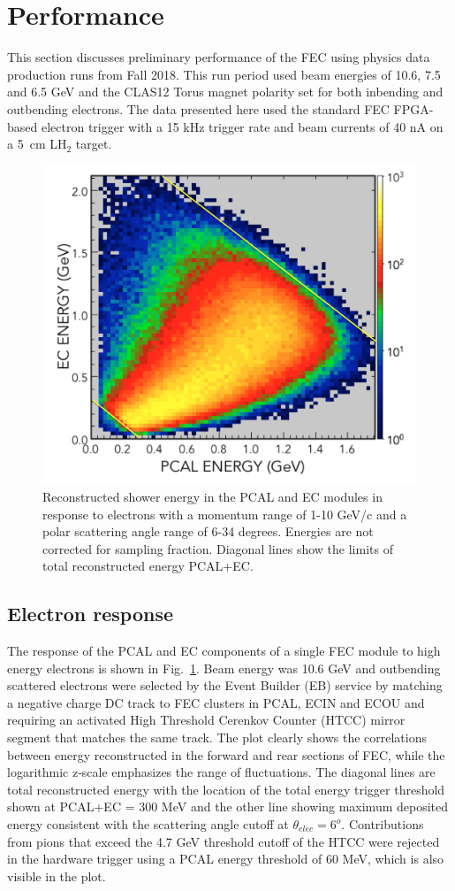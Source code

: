 \section{Performance} \label{Performance}

This section discusses preliminary performance of the FEC using physics data production runs from Fall 2018.  This run period used beam energies of 10.6, 7.5 and 6.5 GeV and the CLAS12 Torus magnet polarity set for both inbending and outbending electrons.  The data presented here used the standard FEC FPGA-based electron trigger with a 15 kHz trigger rate and beam currents of 40 nA on a 5~cm LH$_2$ target.

\begin{figure}[t]
\centering
\includegraphics[width=0.8\columnwidth,keepaspectratio]{img/S10_1_000.png}
\caption[]{Reconstructed shower energy in the PCAL and EC modules in response to electrons with a momentum range of 1-10 GeV/c and a polar scattering angle range of 6-34 degrees.  Energies are not corrected for sampling fraction. Diagonal lines show the limits of total reconstructed energy PCAL+EC.}
\label{fig:S10_1_000}
\end{figure}

\subsection{Electron response}
The response of the PCAL and EC components of a single FEC module to high energy electrons is shown in Fig.~\ref{fig:S10_1_000}.  Beam energy was 10.6 GeV and outbending scattered electrons were selected by the Event Builder (EB) service by matching a negative charge DC track to FEC clusters in PCAL, ECIN and ECOU and requiring an activated High Threshold Cerenkov Counter (HTCC) mirror segment that matches the same track.  The plot clearly shows the correlations between energy reconstructed in the forward and rear sections of FEC, while the logarithmic z-scale emphasizes the range of fluctuations. The diagonal lines are total reconstructed  energy with the location of the total energy trigger threshold shown at PCAL+EC = 300 MeV and the other line showing maximum deposited energy consistent with the scattering angle cutoff at $\theta_{elec}=6^o$. Contributions from pions that exceed the 4.7 GeV threshold cutoff of the HTCC were rejected in the hardware trigger using a PCAL energy threshold of 60 MeV, which is also visible in the plot.

